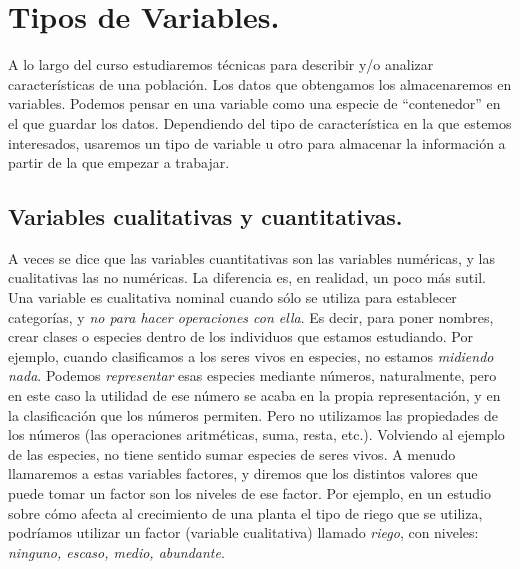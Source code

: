 

\section{Tipos de Variables.}
\label{cap01:sec:TiposVariables}

  A lo largo del curso estudiaremos técnicas para describir y/o analizar
características de una población. Los datos que obtengamos los almacenaremos en
variables. Podemos pensar en una variable como una especie de
``contenedor'' en el que guardar los datos. Dependiendo del tipo de
característica en la que estemos interesados, usaremos un tipo de variable u
otro para almacenar la información a partir de la que empezar a trabajar.

\subsection{Variables cualitativas y cuantitativas.}
\label{cap01:subsec:VariablesCualitativasCuantitativas}

A veces se dice que las variables cuantitativas son las variables
numéricas,
	  y las cualitativas las no numéricas. La diferencia es, en realidad,
	 un poco más sutil. Una variable es {\sf cualitativa nominal}
	   cuando {\sf sólo} se utiliza para
	  establecer categorías, y {\em no para hacer operaciones con ella}. Es
decir, para poner nombres, crear clases o especies dentro de los individuos que
estamos estudiando. Por ejemplo, cuando clasificamos a los seres vivos en
especies, no estamos {\em midiendo nada}. Podemos {\em representar} esas
especies mediante números, naturalmente, pero en este caso la utilidad de ese
número se acaba en la propia representación, y en la clasificación que los
números permiten. Pero no utilizamos las propiedades de los números (las
operaciones aritméticas, suma, resta, etc.).
	Volviendo al ejemplo de las especies, no tiene sentido sumar especies de
seres vivos. A menudo llamaremos a estas variables {\sf
factores}, y diremos que los distintos valores que puede tomar un
factor son los {\sf niveles} de ese factor. Por
ejemplo, en un estudio sobre c\'omo afecta al crecimiento de una planta el tipo
de riego que se utiliza, podríamos utilizar un factor (variable cualitativa)
llamado {\em riego}, con niveles: {\em ninguno, escaso, medio, abundante}.

